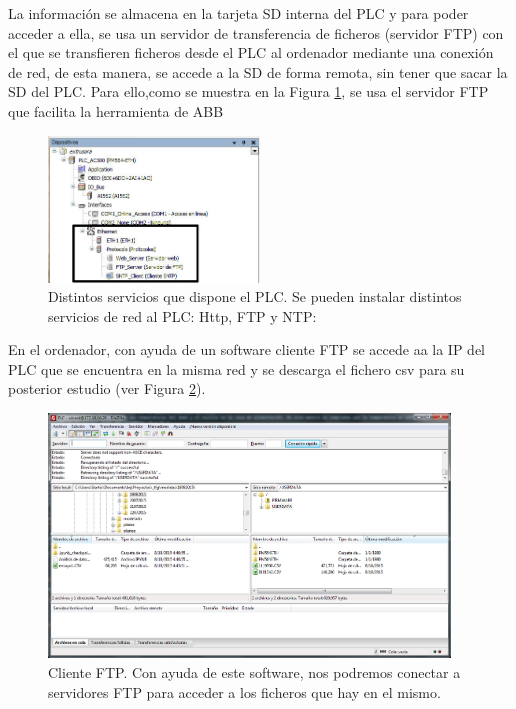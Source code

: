 La información se almacena en la tarjeta SD interna del PLC y para poder acceder a ella, se usa un servidor de transferencia de ficheros (servidor FTP) con el que se transfieren ficheros desde el PLC al ordenador mediante una conexión de red, de esta manera, se accede a la SD de forma remota, sin tener que sacar la SD del PLC. Para ello,como se muestra en la Figura \ref{fig:plc_servicios}, se usa el servidor FTP que facilita la herramienta de ABB\\

\begin{figure}[H]
    \centering
    \includegraphics[width=0.5\textwidth]{images/PLC/servicios_plc.jpg}
    \caption[Distintos servicios que dispone el PLC]{Distintos servicios que dispone el PLC. Se pueden instalar distintos servicios de red al PLC: Http, FTP y NTP:}
    \label{fig:plc_servicios}
\end{figure}

En el ordenador, con ayuda de un software cliente FTP se accede aa la IP del PLC que se encuentra en la misma red y se descarga el fichero csv para su posterior estudio (ver Figura \ref{fig:plc_cliente_ftp}).

\begin{figure}[H]
    \centering
    \includegraphics[width=0.95\textwidth]{images/PLC/cliente_ftp.png}
    \caption[Cliente FTP.]{Cliente FTP. Con ayuda de este software, nos podremos conectar a servidores FTP para acceder a los ficheros que hay en el mismo.}
    \label{fig:plc_cliente_ftp}
\end{figure}


